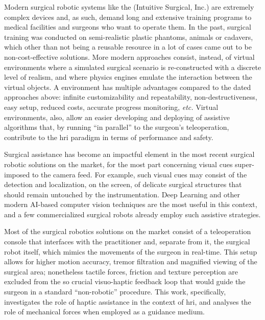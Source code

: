 \documentclass[../main.tex]{subfiles}
\begin{document}
Modern surgical robotic systems like the \davinci (Intuitive Surgical, Inc.) are extremely complex devices and, as such, demand long and extensive training programs to medical facilities and surgeons who want to operate them. In the past, surgical training was conducted on semi-realistic plastic phantoms, animals or cadavers, which other than not being a reusable resource in a lot of cases came out to be non-cost-effective solutions. More modern approaches consist, instead, of virtual environments where a simulated surgical scenario is re-constructed with a discrete level of realism, and where physics engines emulate the interaction between the virtual objects. A \vr environment has multiple advantages compared to the dated approaches above: infinite customizability and repeatability, non-destructiveness, easy setup, reduced costs, accurate progress monitoring, \textit{etc.} Virtual environments, also, allow an easier developing and deploying of assistive algorithms that, by running ``in parallel'' to the surgeon's teleoperation, contribute to the \ac{hri} paradigm in terms of performance and safety. 

Surgical assistance has become an impactful element in the most recent surgical robotic solutions on the market, for the most part concerning visual cues super-imposed to the camera feed. For example, such visual cues may consist of the detection and localization, on the screen, of delicate surgical structures that should remain untouched by the instrumentation. Deep Learning and other modern AI-based computer vision techniques are the most useful in this context, and a few commercialized surgical robots already employ such assistive strategies.

Most of the surgical robotics solutions on the market consist of a teleoperation console that interfaces with the practitioner and, separate from it, the surgical robot itself, which mimics the movements of the surgeon in real-time. This setup allows for higher motion accuracy, tremor filtration and magnified viewing of the surgical area; nonetheless tactile forces, friction and texture perception are excluded from the so crucial visuo-haptic feedback loop that would guide the surgeon in a standard ``non-robotic'' procedure. This work, specifically, investigates the role of haptic assistance in the context of \ac{hri}, and analyses the role of mechanical forces when employed as a guidance medium.
\end{document}
